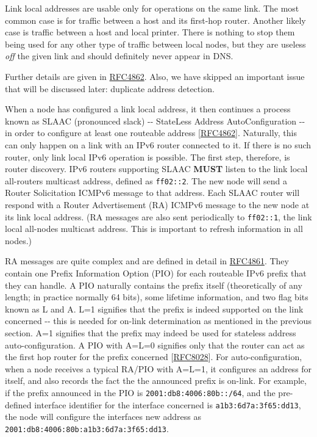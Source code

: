 \documentclass[
]{article}
\begin{document}
Link local addresses are usable only for operations on the same link.
The most common case is for traffic between a host and its first-hop
router. Another likely case is traffic between a host and local printer.
There is nothing to stop them being used for any other type of traffic
between local nodes, but they are useless \emph{off} the given link and
should definitely never appear in DNS.

Further details are given in
\href{https://www.rfc-editor.org/info/rfc4862}{RFC4862}. Also, we have
skipped an important issue that will be discussed later: duplicate
address detection.

When a node has configured a link local address, it then continues a
process known as SLAAC (pronounced
\textquotesingle slack\textquotesingle) -\/- StateLess Address
AutoConfiguration -\/- in order to configure at least one routeable
address {[}\href{https://www.rfc-editor.org/info/rfc4862}{RFC4862}{]}.
Naturally, this can only happen on a link with an IPv6 router connected
to it. If there is no such router, only link local IPv6 operation is
possible. The first step, therefore, is router discovery. IPv6 routers
supporting SLAAC \textbf{MUST} listen to the link local all-routers
multicast address, defined as \texttt{ff02::2}. The new node will send a
Router Solicitation ICMPv6 message to that address. Each SLAAC router
will respond with a Router Advertisement (RA) ICMPv6 message to the new
node at its link local address. (RA messages are also sent periodically
to \texttt{ff02::1}, the link local all-nodes multicast address. This is
important to refresh information in all nodes.)

RA messages are quite complex and are defined in detail in
\href{https://www.rfc-editor.org/info/rfc4861}{RFC4861}. They contain
one Prefix Information Option (PIO) for each routeable IPv6 prefix that
they can handle. A PIO naturally contains the prefix itself
(theoretically of any length; in practice normally 64 bits), some
lifetime information, and two flag bits known as L and A. L=1 signifies
that the prefix is indeed supported on the link concerned -\/- this is
needed for on-link determination as mentioned in the previous section.
A=1 signifies that the prefix may indeed be used for stateless address
auto-configuration. A PIO with A=L=0 signifies only that the router can
act as the first hop router for the prefix concerned
{[}\href{https://www.rfc-editor.org/info/rfc8028}{RFC8028}{]}. For
auto-configuration, when a node receives a typical RA/PIO with A=L=1, it
configures an address for itself, and also records the fact the the
announced prefix is on-link. For example, if the prefix announced in the
PIO is \texttt{2001:db8:4006:80b::/64}, and the pre-defined interface
identifier for the interface concerned is \texttt{a1b3:6d7a:3f65:dd13},
the node will configure the interface\textquotesingle s new address as
\texttt{2001:db8:4006:80b:a1b3:6d7a:3f65:dd13}.
\end{document}
